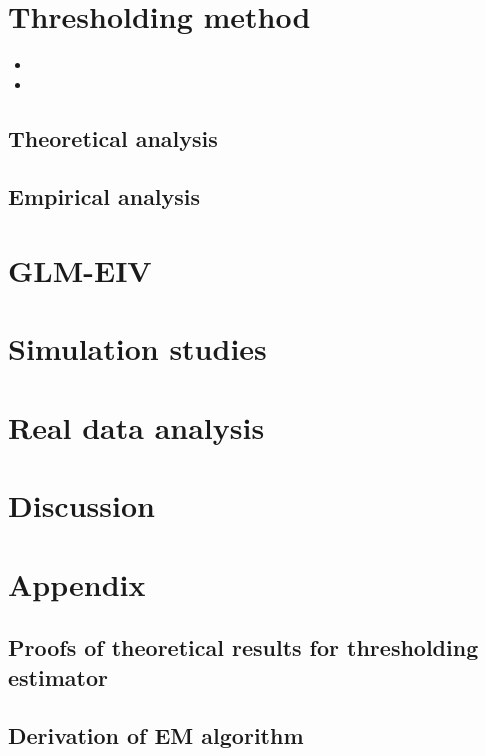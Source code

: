 \documentclass[12pt]{article}
\begin{document}
\section{Thresholding method}

\begin{itemize}
\item 
\item 
\end{itemize}

\subsection{Theoretical analysis}

\subsection{Empirical analysis}

\section{GLM-EIV}

\section{Simulation studies}

\section{Real data analysis}

\section{Discussion}

\section{Appendix}


\subsection{Proofs of theoretical results for thresholding estimator}

\subsection{Derivation of EM algorithm}
\end{document}
